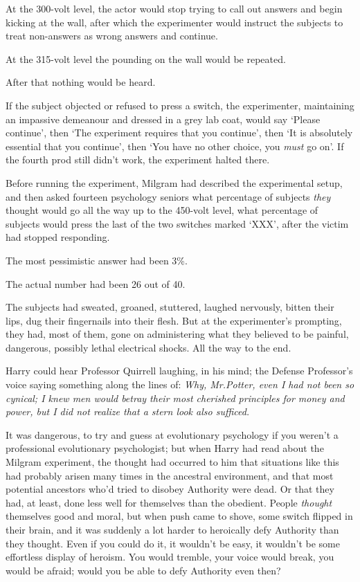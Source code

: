 At the 300-volt level, the actor would stop trying to call out answers and begin kicking at the wall, after which the experimenter would instruct the subjects to treat non-answers as wrong answers and continue.

At the 315-volt level the pounding on the wall would be repeated.

After that nothing would be heard.

If the subject objected or refused to press a switch, the experimenter, maintaining an impassive demeanour and dressed in a grey lab coat, would say `Please continue', then `The experiment requires that you continue', then `It is absolutely essential that you continue', then `You have no other choice, you \emph{must} go on'. If the fourth prod still didn't work, the experiment halted there.

Before running the experiment, Milgram had described the experimental setup, and then asked fourteen psychology seniors what percentage of subjects \emph{they} thought would go all the way up to the 450-volt level, what percentage of subjects would press the last of the two switches marked `XXX', after the victim had stopped responding.

The most pessimistic answer had been 3\%.

The actual number had been 26 out of 40.

The subjects had sweated, groaned, stuttered, laughed nervously, bitten their lips, dug their fingernails into their flesh. But at the experimenter's prompting, they had, most of them, gone on administering what they believed to be painful, dangerous, possibly lethal electrical shocks. All the way to the end.

Harry could hear Professor Quirrell laughing, in his mind; the Defense Professor's voice saying something along the lines of: \emph{Why, Mr.\?Potter, even I had not been so cynical; I knew men would betray their most cherished principles for money and power, but I did not realize that a stern look also sufficed.}

It was dangerous, to try and guess at evolutionary psychology if you weren't a professional evolutionary psychologist; but when Harry had read about the Milgram experiment, the thought had occurred to him that situations like this had probably arisen many times in the ancestral environment, and that most potential ancestors who'd tried to disobey Authority were dead. Or that they had, at least, done less well for themselves than the obedient. People \emph{thought} themselves good and moral, but when push came to shove, some switch flipped in their brain, and it was suddenly a lot harder to heroically defy Authority than they thought. Even if you could do it, it wouldn't be easy, it wouldn't be some effortless display of heroism. You would tremble, your voice would break, you would be afraid; would you be able to defy Authority even then?

